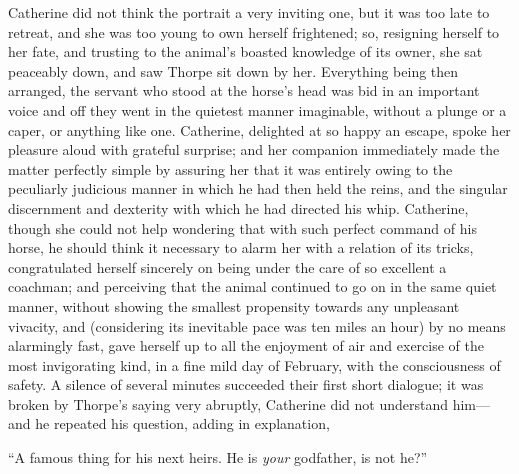 Catherine did not think the portrait a very inviting one, but it was too late to retreat, and she was too young to own herself frightened; so, resigning herself to her fate, and trusting to the animal's boasted knowledge of its owner, she sat peaceably down, and saw Thorpe sit down by her. Everything being then arranged, the servant who stood at the horse's head was bid in an important voice  and off they went in the quietest manner imaginable, without a plunge or a caper, or anything like one. Catherine, delighted at so happy an escape, spoke her pleasure aloud with grateful surprise; and her companion immediately made the matter perfectly simple by assuring her that it was entirely owing to the peculiarly judicious manner in which he had then held the reins, and the singular discernment and dexterity with which he had directed his whip. Catherine, though she could not help wondering that with such perfect command of his horse, he should think it necessary to alarm her with a relation of its tricks, congratulated herself sincerely on being under the care of so excellent a coachman; and perceiving that the animal continued to go on in the same quiet manner, without showing the smallest propensity towards any unpleasant vivacity, and (considering its inevitable pace was ten miles an hour) by no means alarmingly fast, gave herself up to all the enjoyment of air and exercise of the most invigorating kind, in a fine mild day of February, with the consciousness of safety. A silence of several minutes succeeded their first short dialogue; it was broken by Thorpe's saying very abruptly,  Catherine did not understand him---and he repeated his question, adding in explanation, 




“A famous thing for his next heirs. He is {\em your} godfather, is not he?”





